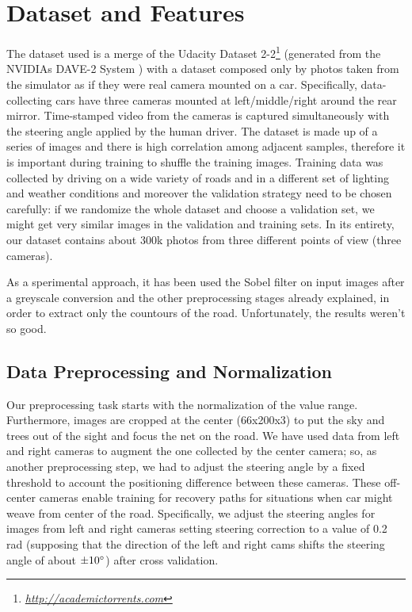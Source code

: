 \documentclass[10pt,twocolumn,letterpaper]{article}
\begin{document}
\section{Dataset and Features}
The dataset used is a merge of the Udacity Dataset 2-2\footnote{\href{http://academictorrents.com/details/bcde779f81adbaae45ef69f9dd07f3e76eab3b27}{\textit{http://academictorrents.com}}} (generated from the NVIDIAs DAVE-2 System \cite{Alpher05}) with a dataset composed only by photos taken from the simulator as if they were real camera mounted on a car. Specifically, data-collecting cars have three cameras mounted at left/middle/right around the rear mirror. Time-stamped video from the cameras is captured simultaneously with the steering angle applied by the human driver. The dataset is made up of a series of images and there is high correlation among adjacent samples, therefore it is important during training to shuffle the training images. Training data was collected by driving on a wide variety of roads and in a different set of lighting and weather conditions and moreover the validation strategy need to be chosen carefully: if we randomize the whole dataset and choose a validation set, we might get very similar images in the validation and training sets. In its entirety, our dataset contains about 300k photos from three different points of view (three cameras).

As a sperimental approach, it has been used the Sobel filter on input images after a greyscale conversion and the other preprocessing stages already explained, in order to extract only the countours of the road. Unfortunately, the results weren't so good.

\subsection{Data Preprocessing and Normalization}
Our preprocessing task starts with the normalization of the value range. Furthermore, images are cropped at the center (66x200x3) to put the sky and trees out of the sight and focus the net on the road. We have used data from left and right cameras to augment the one collected by the center camera; so, as another preprocessing step, we had to adjust the steering angle by a fixed threshold to account the positioning difference between these cameras. These off-center cameras enable training for recovery paths for situations when car might weave from center of the road. Specifically, we adjust the steering angles for images from left and right cameras setting steering correction to a value of 0.2 rad (supposing that the direction of the left and right cams shifts the steering angle of about $\pm 10\degree$) after cross validation.
\end{document}
